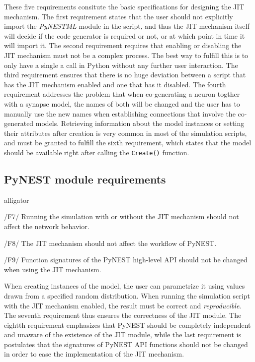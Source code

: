 These five requirements consitute the basic specifications for designing the JIT mechanism. The first requirement states that the user should not explicitly import the \emph{PyNESTML} module in the script, and thus the JIT mechanism itself will decide if the code generator is required or not, or at which point in time it will import it. The second requirement requires that enabling or disabling the JIT mechanism must not be a complex process. The best way to fulfill this is to only have a single a call in Python without any further user interaction. The third requirement ensures that there is no huge deviation between a script that has the JIT mechanism enabled and one that has it disabled. The fourth requirement addresses the problem that when co-generating a neuron togther with a synapse model, the names of both will be changed and the user has to manually use the new names when establishing connections that involve the co-generated models. Retrieving information about the model instances or setting their attributes after creation is very common in most of the simulation scripts, and must be granted to fulfill the sixth requirement, which states that the model should be available right after calling the \texttt{Create()} function.

\subsection*{PyNEST module requirements}

\begin{labeling}{alligator}
   \item[/F7/] Running the simulation with or without the JIT mechanism should not affect the network behavior.
   \item[/F8/] The JIT mechanism should not affect the workflow of PyNEST.
   \item[/F9/] Function signatures of the PyNEST high-level API should not be changed when using the JIT mechanism.
\end{labeling}

When creating instances of the model, the user can parametrize it using values drawn from a specified random distribution. When running the simulation script with the JIT mechanism enabled, the result must be correct and \emph{reproducible}. The seventh requirement thus ensures the correctness of the JIT module. The eightth requirement emphasizes that PyNEST should be completely independent and unaware of the existence of the JIT module, while the last requirement is postulates that the signatures of PyNEST API functions should not be changed in order to ease the implementation of the JIT mechanism.

